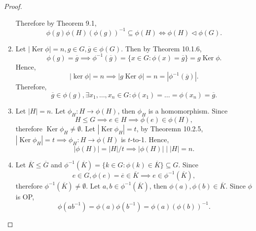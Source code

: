 \documentclass{article}
\theoremstyle{definition}
\DeclareMathOperator{\Ker}{Ker}
\begin{document}
\begin{proof}
\begin{enumerate}
\begin{equation*}
           \end{equation*}
           Therefore by Theorem 9.1,
           \begin{equation*}
               \phi(g)\phi(H)(\phi(g))^{-1} \subseteq \phi(H) \iff \phi(H) \lhd \phi(G).
           \end{equation*}
           \item Let $|\Ker\phi|=n,g\in G, \overline{g}\in\phi(G)$. Then by Theorem 10.1.6,
           \begin{equation*}
               \phi(g) = \overline{g} \implies \phi^{-1}(\overline{g}) = \{x\in G: \phi(x) = \overline{g}\} = g\Ker\phi.
           \end{equation*}
           Hence,
           \begin{equation*}
               |\ker\phi|=n \implies|g\Ker\phi|=n=|\phi^{-1}(\overline{g})|.
           \end{equation*}
           Therefore,
           \begin{equation*}
               \overline{g} \in \phi(g), \exists x_1,\dots,x_n \in G: \phi(x_1)=\dots=\phi(x_n)=\overline{g}.
           \end{equation*}
           \item Let $|H|=n$. Let $\phi_H: H \to \phi(H)$, then $\phi_H$ is a homomorphism. Since
           \begin{equation*}
               H \leq G \implies e \in H \implies \phi(e) \in \phi(H),
           \end{equation*}
           therefore $\Ker\phi_H \neq \emptyset$. Let $|\Ker\phi_H|=t$, by Theoremn 10.2.5, $|\Ker\phi_H|=t \implies \phi_H:H\to\phi(H)$ is $t$-to-1. Hence,
           \begin{equation*}
               |\phi(H)|=|H|/t \implies |\phi(H)|\mid|H|=n.
           \end{equation*}
           \item Let $\overline{K} \leq \overline{G}$ and $\phi^{-1}(\overline{K}) = \{k\in G: \phi(k) \in \overline{K}\} \subseteq G$. Since
           \begin{equation*}
               e \in G, \phi(e) = \overline{e} \in \overline{K} \implies e \in \phi^{-1}(\overline{K}),
           \end{equation*}
           therefore $\phi^{-1}(\overline{K}) \neq \emptyset$. Let $a,b \in \phi^{-1}(\overline{K})$, then $\phi(a),\phi(b) \in \overline{K}$. Since $\phi$ is OP,
           \begin{equation*}
               \phi(ab^{-1}) = \phi(a)\phi(b^{-1}) = \phi(a)(\phi(b))^{-1}.

\end{equation*}
\end{enumerate}
\end{proof}
\end{document}
